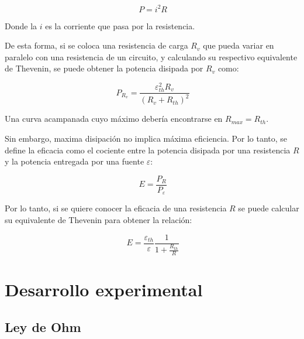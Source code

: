 \documentclass[11pt,a4paper]{article}
\begin{document}
\begin{equation}\label{Joule}
\ P = i^2 R
\end{equation}

Donde la $i$ es la corriente que pasa por la resistencia. 

De esta forma, si se coloca una resistencia de carga $R_{v}$ que pueda variar en paralelo con una resistencia de un circuito, y calculando su respectivo equivalente de Thevenin, se puede obtener la potencia disipada por $R_{v}$ como:

\begin{equation}\label{Pot}
\ P_{R_{v}}=\frac{\varepsilon_{th}^2 R_{v}}{(R_{v}+R_{th})^2}
\end{equation}

Una curva acampanada cuyo máximo debería encontrarse en $R_{max} = R_{th}$.

Sin embargo, maxima disipación no implica máxima eficiencia. Por lo tanto, se define la eficacia como el cociente entre la potencia disipada por una resistencia $R$ y la potencia entregada por una fuente $\varepsilon$:

\begin{equation}\label{eficacia}
\ E=\frac{P_{R}}{P_{\varepsilon}}
\end{equation}

Por lo tanto, si se quiere conocer la eficacia de una resistencia $R$ se puede calcular su equivalente de Thevenin para obtener la relación:

\begin{equation}\label{efi}
\ E= \frac{\varepsilon_{th}}{\varepsilon}\frac{1}{1+\frac{R_{th}}{R}}
\end{equation}


\section{Desarrollo experimental}

\subsection{Ley de Ohm}
\end{document}
